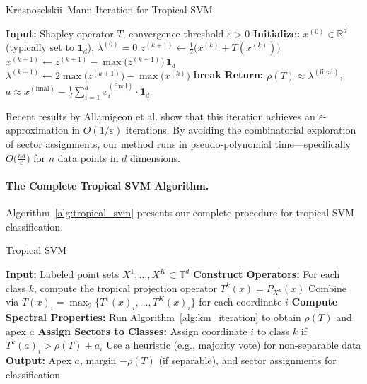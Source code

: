 \documentclass{article}
\newcommand{\R}{\mathbb{R}}
\newcommand{\trop}{\mathbb{T}}
\begin{document}
\begin{algorithm}
\caption{Krasnoselskii--Mann Iteration for Tropical SVM}\label{alg:km_iteration}
\begin{algorithmic}[1]
\STATE \textbf{Input:} Shapley operator $T$, convergence threshold $\varepsilon > 0$
\STATE \textbf{Initialize:} $x^{(0)} \in \R^d$ (typically set to $\mathbf{1}_d$), $\lambda^{(0)} = 0$
  \STATE $z^{(k+1)} \leftarrow \frac{1}{2}\bigl(x^{(k)} + T(x^{(k)})\bigr)$ 
  \STATE $x^{(k+1)} \leftarrow z^{(k+1)} - \max\bigl(z^{(k+1)}\bigr)\,\mathbf{1}_d$ 
  \STATE $\lambda^{(k+1)} \leftarrow 2\max\bigl(z^{(k+1)}\bigr) - \max\bigl(x^{(k)}\bigr)$ 
    \STATE \textbf{break}
  \ENDIF
\ENDFOR
\STATE \textbf{Return:} $\rho(T) \approx \lambda^{(\text{final})}$, $a \approx x^{(\text{final})} - \frac{1}{d}\sum_{i=1}^d x_i^{(\text{final})} \cdot \mathbf{1}_d$
\end{algorithmic}
\end{algorithm}
Recent results by Allamigeon et al. \cite{allamigeon2025} show that this iteration achieves an $\varepsilon$-approximation in $O(1/\varepsilon)$ iterations. By avoiding the combinatorial exploration of sector assignments, our method runs in pseudo-polynomial time—specifically $O\bigl(\frac{nd}{\varepsilon}\bigr)$ for $n$ data points in $d$ dimensions.

\paragraph{The Complete Tropical SVM Algorithm.}\label{subsec:complete_algorithm}
Algorithm~\ref{alg:tropical_svm} presents our complete procedure for tropical SVM classification.

\begin{algorithm}
\caption{Tropical SVM}\label{alg:tropical_svm}
\begin{algorithmic}[1]
\STATE \textbf{Input:} Labeled point sets $X^1,\dots,X^K \subset \trop^d$
\STATE \textbf{Construct Operators:}
  \STATE \quad For each class $k$, compute the tropical projection operator $T^k(x) = P_{X^k}(x)$
  \STATE \quad Combine via $T(x)_i = \operatorname{\max}_2\{T^1(x)_i, \dots, T^K(x)_i\}$ for each coordinate $i$
\STATE \textbf{Compute Spectral Properties:}
  \STATE \quad Run Algorithm~\ref{alg:km_iteration} to obtain $\rho(T)$ and apex $a$
\STATE \textbf{Assign Sectors to Classes:}
    \STATE Assign coordinate $i$ to class $k$ if $T^k(a)_i > \rho(T) + a_i$ 
  \ELSE
    \STATE Use a heuristic (e.g., majority vote) for non-separable data 
  \ENDIF
\STATE \textbf{Output:} Apex $a$, margin $-\rho(T)$ (if separable), and sector assignments for classification
\end{algorithmic}
\end{algorithm}
\end{document}
